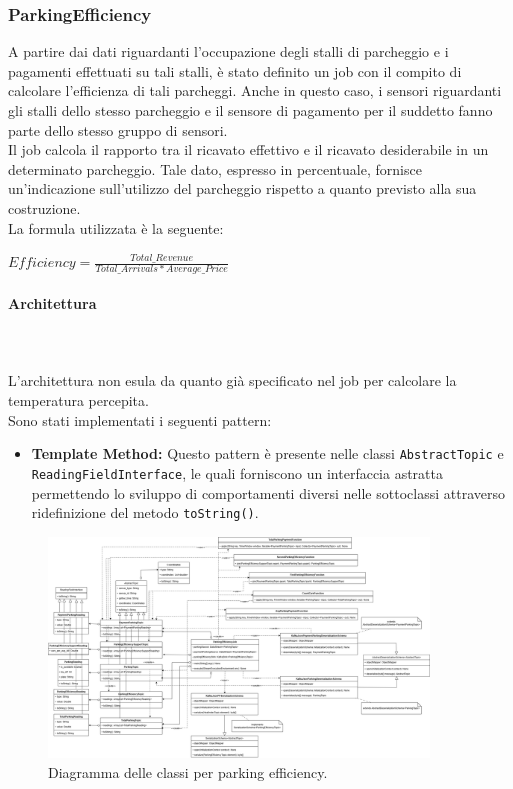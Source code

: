 \documentclass[8pt]{article}
\newcommand{\subsubsubsection}[1]{\paragraph{#1}\mbox{}\\\\}
\begin{document}
\subsubsection{ParkingEfficiency}
A partire dai dati riguardanti l'occupazione degli stalli di parcheggio e i pagamenti effettuati su tali stalli, è stato definito un job con il compito di calcolare l'efficienza di tali parcheggi. Anche in questo caso, i sensori riguardanti gli stalli dello stesso parcheggio e il sensore di pagamento per il suddetto fanno parte dello stesso gruppo di sensori.
\\Il job calcola il rapporto tra il ricavato effettivo e il ricavato desiderabile in un determinato parcheggio. Tale dato, espresso in percentuale, fornisce un'indicazione sull'utilizzo del parcheggio rispetto a quanto previsto alla sua costruzione.\\La formula utilizzata è la seguente:
\begin{center}
    $Efficiency = \frac{Total\_Revenue}{Total\_Arrivals * Average\_Price}$
\end{center}
\subsubsubsection{Architettura}
L'architettura non esula da quanto già specificato nel job per calcolare la temperatura percepita.
\\Sono stati implementati i seguenti pattern:
\begin{itemize}
	\setlength\itemsep{0em}
    \item \textbf{Template Method:}
    Questo pattern è presente nelle classi \verb|AbstractTopic| e \verb|ReadingFieldInterface|, le quali forniscono un interfaccia astratta permettendo lo sviluppo di comportamenti diversi nelle sottoclassi attraverso ridefinizione del metodo \verb|toString()|.
\end{itemize}
\begin{figure}[h!]
    \centering
    \includegraphics[width=0.9\textwidth]{images_st/parkingefficiencyjob.png}
    \caption{Diagramma delle classi per parking efficiency.}
    \label{fig:Diagramma delle classi per parking efficiency}
\end{figure}
\end{document}
